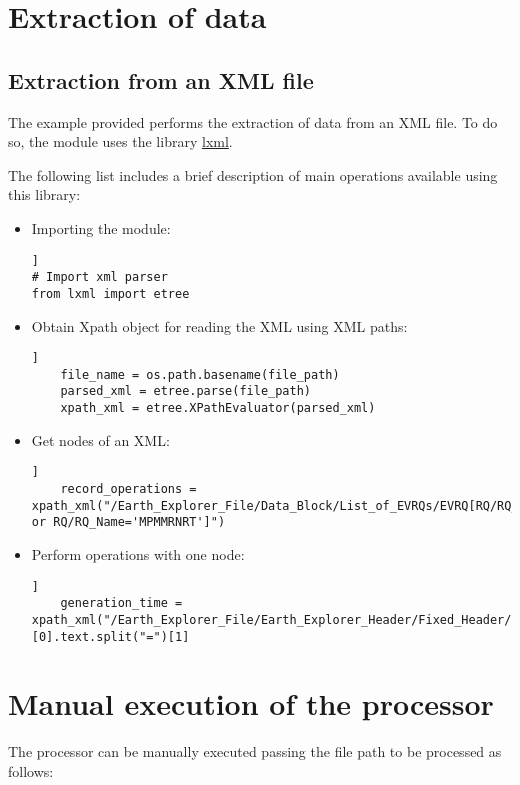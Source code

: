 \section{Extraction of data}

\subsection{Extraction from an XML file}

The example provided performs the extraction of data from an XML file. To do so, the module uses the library \href{https://pypi.org/project/lxml/}{lxml}.

The following list includes a brief description of main operations available using this library:

\begin{itemize}
\item Importing the module:
\begin{lstlisting}[breaklines=true, style=python]]
# Import xml parser
from lxml import etree
\end{lstlisting}
\item Obtain Xpath object for reading the XML using XML paths:
\begin{lstlisting}[breaklines=true, style=python]]
    file_name = os.path.basename(file_path)
    parsed_xml = etree.parse(file_path)
    xpath_xml = etree.XPathEvaluator(parsed_xml)
\end{lstlisting}
\item Get nodes of an XML:
\begin{lstlisting}[breaklines=true, style=python]]
    record_operations = xpath_xml("/Earth_Explorer_File/Data_Block/List_of_EVRQs/EVRQ[RQ/RQ_Name='MPMMRNOM' or RQ/RQ_Name='MPMMRNRT']")
\end{lstlisting}
\item Perform operations with one node:
\begin{lstlisting}[breaklines=true, style=python]]
    generation_time = xpath_xml("/Earth_Explorer_File/Earth_Explorer_Header/Fixed_Header/Source/Creation_Date")[0].text.split("=")[1]
\end{lstlisting}
\end{itemize}

\section{Manual execution of the processor}

The processor can be manually executed passing the file path to be processed as follows:

